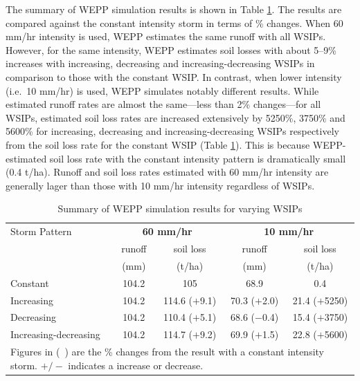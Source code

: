 The summary of WEPP simulation results is shown in Table
\ref{tab:WEPPSimulationResults}. The results are compared against the constant
intensity storm in terms of \% changes. When 60 mm/hr intensity is used, WEPP
estimates the same runoff with all WSIPs. However, for the same intensity, WEPP
estimates soil losses with about 5--9\% increases with increasing, decreasing
and increasing-decreasing WSIPs in comparison to those with the constant WSIP.
In contrast, when lower intensity (i.e.\ 10 mm/hr) is used, WEPP simulates
notably different results. While estimated runoff rates are almost the
same---less than 2\% changes---for all WSIPs, estimated soil loss rates are
increased extensively by 5250\%, 3750\% and 5600\% for increasing, decreasing
and increasing-decreasing WSIPs respectively from the soil loss rate for the
constant WSIP (Table \ref{tab:WEPPSimulationResults}). This is because
WEPP-estimated soil loss rate with the constant intensity pattern is
dramatically small (0.4 t/ha). Runoff and soil loss rates estimated with 60
mm/hr intensity are generally lager than those with 10 mm/hr intensity
regardless of WSIPs.

\begin{table}[htbp]
  \caption{Summary of WEPP simulation results for varying WSIPs}
  \label{tab:WEPPSimulationResults}
  \centering
    \begin{tabular}{lcccc}
      \toprule
      Storm Pattern & \multicolumn{2}{c}{\textbf{60 mm/hr}} &
\multicolumn{2}{c}{\textbf{10 mm/hr}}\\
      \cmidrule(r){2-3} \cmidrule(l){4-5}
      & runoff  & soil loss  & runoff & soil loss\\
      & (mm) & (t/ha) & (mm) & (t/ha)\\
      \midrule
      Constant & 104.2 & 105 & 68.9 & 0.4\\
      Increasing & 104.2 & 114.6 ($+$9.1) & 70.3 ($+$2.0) & 21.4 ($+$5250)\\
      Decreasing & 104.2 & 110.4 ($+$5.1) & 68.6 ($-$0.4) & 15.4 ($+$3750)\\
      Increasing-decreasing & 104.2 & 114.7 ($+$9.2) & 69.9 ($+$1.5) & 22.8
($+$5600)\\
      \bottomrule
      \multicolumn{5}{p{10cm}}{\footnotesize Figures in (\ )
are the \% changes from the result with a constant intensity storm. $+/-$
indicates a increase or decrease.}\\
    \end{tabular}
\end{table}

